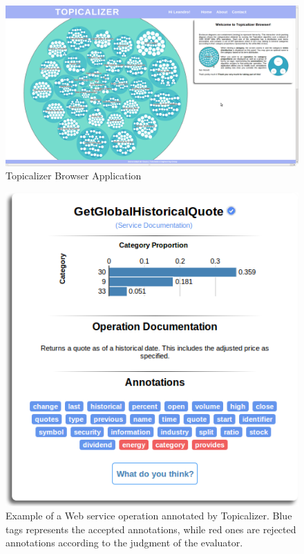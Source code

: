 \begin{figure}[H]
\includegraphics[scale=0.215]{images/TopicalizerBrowser}

\caption{Topicalizer Browser Application}
\label{topicalizer-browser}

\end{figure}

\begin{figure}[H]
\begin{center}
\includegraphics[scale=0.40]{images/EvaluatedOperation}
\caption{Example of a Web service operation annotated by Topicalizer. Blue tags represents the accepted annotations, while red ones are rejected annotations according to the judgment of the evaluator.}
\label{evaluated-operation} 
\end{center}
\end{figure}

